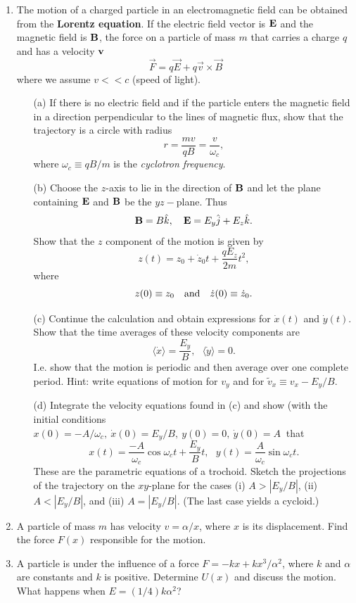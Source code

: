 \begin{enumerate}
\item The motion of a charged particle in an electromagnetic field can be obtained from the {\bf Lorentz equation}. If the electric field vector is ${\bf E}$ and the magnetic field is ${\bf B}$, the force on a particle of mass $m$ that carries a charge $q$ and has a velocity ${\bf v}$
\[
\vec{F}=q\vec{E}+q\vec{v}\times\vec{B}
\]
where we assume $v<<c$ (speed of light).
\begin{itemize}\itemsep=0pt
\item[(a)] If there is no electric field and if the particle enters the magnetic field in a direction perpendicular to the lines of magnetic flux, show that the trajectory is a circle with radius
\[
r=\frac{mv}{qB}=\frac{v}{\omega_c},
\]
where $\omega_c\equiv qB/m$ is the {\it cyclotron frequency}.
\item[(b)] Choose the $z$-axis to lie in the direction of ${\bf B}$ and let the plane containing ${\bf E}$ and ${\bf B}$ be the $yz-$plane. Thus
\[
{\bf B}=B\hat{k},~~~{\bf E}=E_y\hat{j}+E_z\hat{k}.
\]
Show that the $z$ component of the motion is given by
\[
z(t)=z_0+\dot{z}_0t+\frac{qE_z}{2m}t^2,
\]
where
\[
z(0)\equiv z_0~~~{\rm and}~~~\dot{z}(0)\equiv \dot{z}_0.
\]
\item[(c)] Continue the calculation and obtain expressions for $\dot{x}(t)$ and $\dot{y}(t)$. Show that the time averages of these velocity components are
\[
\langle\dot{x}\rangle=\frac{E_y}{B},~~~\langle\dot{y}\rangle=0.
\]
I.e. show that the motion is periodic and then average over one complete period. Hint: write equations of motion for $v_y$ and for $\tilde{v}_x\equiv v_x-E_y/B$.
\item[(d)] Integrate the velocity equations found in (c) and show (with the initial conditions $x(0)=-A/\omega_c,~\dot{x}(0)=E_y/B,~y(0)=0,~\dot{y}(0)=A~$ that
\[
x(t)=\frac{-A}{\omega_c}\cos\omega_ct+\frac{E_y}{B}t,~~~y(t)=\frac{A}{\omega_c}\sin\omega_ct.
\]
These are the parametric equations of a trochoid. Sketch the projections of the trajectory on the $xy$-plane for the cases (i) $A>|E_y/B|$, (ii) $A<|E_y/B|$, and (iii) $A=|E_y/B|$. (The last case yields a cycloid.)

\end{itemize}

\item A particle of mass $m$ has velocity $v=\alpha/x$, where $x$ is its displacement. Find the force $F(x)$ responsible for the motion.

\item A particle is under the influence of a force $F=-kx+kx^3/\alpha^2$, where $k$ and $\alpha$ are constants and $k$ is positive. Determine $U(x)$ and discuss the motion. What happens when $E=(1/4)k\alpha^2$?


\end{enumerate}
